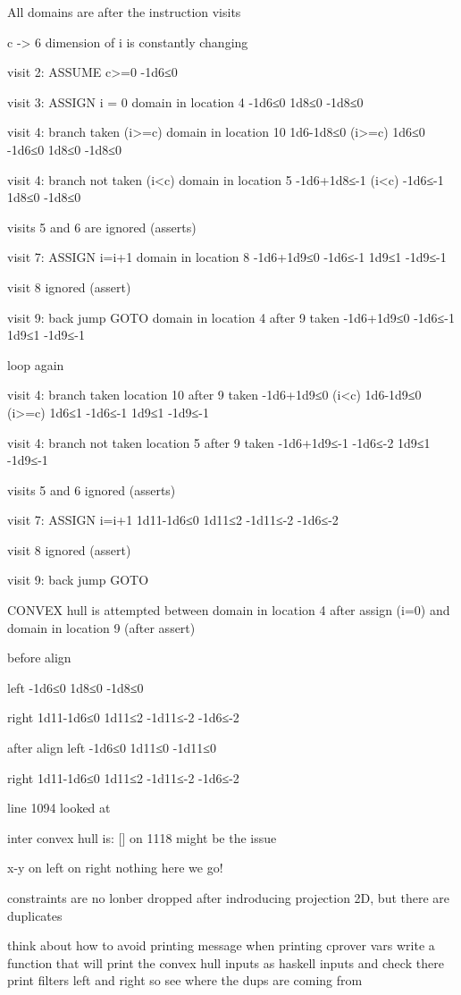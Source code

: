 All domains are after the instruction visits

c -> 6
dimension of i is constantly changing

visit 2:  ASSUME c>=0
-1d6≤0 

visit 3: ASSIGN i = 0
domain in location 4
-1d6≤0
1d8≤0
-1d8≤0

visit 4: branch taken (i>=c)
domain in location 10
1d6-1d8≤0 (i>=c)
1d6≤0
-1d6≤0
1d8≤0
-1d8≤0

visit 4: branch not taken (i<c)
domain in location 5
-1d6+1d8≤-1 (i<c)
-1d6≤-1
1d8≤0
-1d8≤0

visits 5 and 6 are ignored (asserts)

visit 7: ASSIGN i=i+1
domain in location 8
-1d6+1d9≤0
-1d6≤-1
1d9≤1
-1d9≤-1

visit 8 ignored (assert)

visit 9: back jump GOTO
domain in location 4 after 9 taken 
-1d6+1d9≤0
-1d6≤-1
1d9≤1
-1d9≤-1

loop again

visit 4: branch taken 
location 10 after 9 taken
-1d6+1d9≤0 (i<c)
1d6-1d9≤0 (i>=c)
1d6≤1
-1d6≤-1
1d9≤1
-1d9≤-1

visit 4: branch not taken 
location 5 after 9 taken
-1d6+1d9≤-1
-1d6≤-2
1d9≤1
-1d9≤-1

visits 5 and 6 ignored (asserts)

visit 7: ASSIGN i=i+1
1d11-1d6≤0
1d11≤2
-1d11≤-2
-1d6≤-2

visit 8 ignored (assert)

visit 9: back jump GOTO

CONVEX hull is attempted between domain in 
location 4 after assign (i=0)
and domain in location 9 (after assert)

before align 

left 
-1d6≤0
1d8≤0
-1d8≤0

right 
1d11-1d6≤0
1d11≤2
-1d11≤-2
-1d6≤-2

after align 
left 
-1d6≤0
1d11≤0
-1d11≤0

right
1d11-1d6≤0
1d11≤2
-1d11≤-2
-1d6≤-2

line 1094 looked at

inter convex hull is: 
[]
 on 1118 might be the issue 

 x-y on left  on right nothing here we go!

 constraints are no lonber dropped after indroducing projection 2D, but there are duplicates

 think about how to avoid printing message when printing cprover vars 
 write a function that will print the convex hull inputs as haskell inputs and check there 
 print filters left and right so see where the dups are coming from


